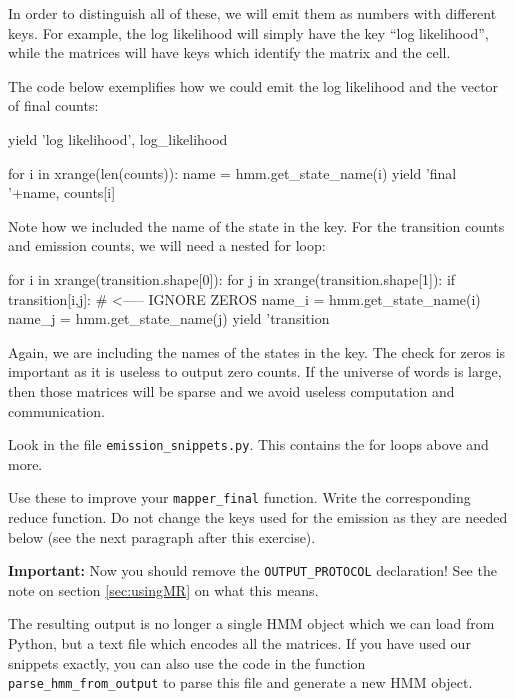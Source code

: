 In order to distinguish all of these, we will emit them as numbers with
different keys. For example, the log likelihood will simply have the key ``log
likelihood'', while the matrices will have keys which identify the matrix and the
cell.

The code below exemplifies how we could emit the log likelihood and the vector of final counts:

\begin{python}
yield 'log likelihood', log_likelihood

for i in xrange(len(counts)):
    name = hmm.get_state_name(i)
    yield 'final '+name, counts[i]
\end{python} %

Note how we included the name of the state in the key. For the transition counts and emission counts, we will need a nested for loop:

\begin{python}
for i in xrange(transition.shape[0]):
    for j in xrange(transition.shape[1]):
        if transition[i,j]: # <----- IGNORE ZEROS
            name_i = hmm.get_state_name(i)
            name_j = hmm.get_state_name(j)
            yield 'transition %
\end{python}

Again, we are including the names of the states in the key. The check for zeros is important as it is useless to output zero counts. If the
universe of words is large, then those matrices will be sparse and we avoid useless computation and communication.

\begin{exercise}
Look in the file \verb+emission_snippets.py+. This contains the for loops above
and more.

Use these to improve your \verb+mapper_final+ function. Write the corresponding
reduce function. Do not change the keys used for the emission as they are
needed below (see the next paragraph after this exercise).

\textbf{Important:} Now you should remove the \verb+OUTPUT_PROTOCOL+
declaration! See the note on section \ref{sec:usingMR} on what this means.
\end{exercise}

The resulting output is no longer a single HMM object which we can load from
Python, but a text file which encodes all the matrices. If you have used our
snippets exactly, you can also use the code in the function
\verb+parse_hmm_from_output+ to parse this file and generate a new HMM object.

